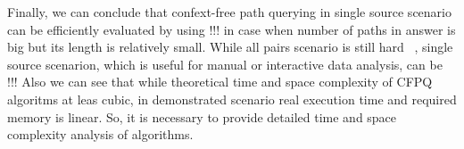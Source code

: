 Finally, we can conclude that confext-free path querying in single source scenario can be efficiently evaluated by using !!! in case when number of paths in answer is big but its length is relatively small.
While all pairs scenario is still hard ~\cite{!!!}, single source scenarion, which is useful for manual or interactive data analysis, can be !!!
Also we can see that while theoretical time and space complexity of CFPQ algoritms at leas cubic, in demonstrated scenario real execution time and required memory is linear.
So, it is necessary to provide detailed time and space complexity analysis of algorithms.
